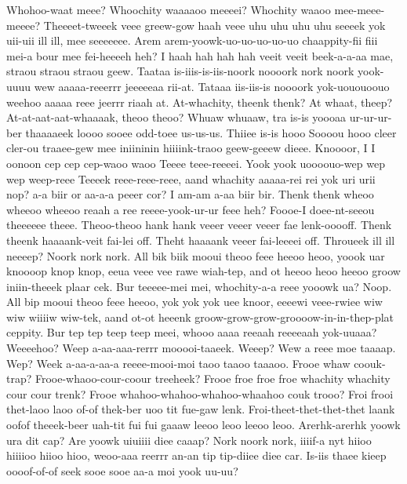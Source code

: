 \documentclass[12pt,a4paper]{article}
\begin{document}
\begin{drama}
\epopspeaks
Whohoo-waat meee? Whoochity waaaaoo meeeei? Whochity waaoo mee-meee-meeee?
\euelspeaks
Theeeet-tweeek veee greew-gow haah veee uhu uhu uhu uhu seeeek yok uii-uii ill ill, mee seeeeeee.
\epopspeaks
Arem arem-yoowk-uo-uo-uo-uo-uo chaappity-fii fiii mei-a bour mee fei-heeeeh heh? I haah hah hah hah veeit veeit beek-a-a-aa mae, straou straou straou geew.
\euelspeaks
Taataa is-iiis-is-iis-noork noooork nork noork yook-uuuu wew aaaaa-reeerrr jeeeeeaa rii-at. Tataaa iis-iis-is noooork yok-uououoouo weehoo aaaaa reee jeerrr riaah at.
\epopspeaks
At-whachity, theenk thenk? At whaat, theep? At-at-aat-aat-whaaaak, theoo theoo?
\euelspeaks
Whuaw whuaaw, tra is-is yoooaa ur-ur-ur-ber thaaaaeek loooo sooee odd-toee us-us-us.
\epopspeaks
Thiiee is-is hooo Soooou hooo cleer cler-ou traaee-gew mee iniininin hiiiink-traoo geew-geeew dieee. Knoooor, I I oonoon cep cep cep-waoo waoo Teeee teee-reeeei.
\euelspeaks
Yook yook uoooouo-wep wep wep weep-reee Teeeek reee-reee-reee, aand whachity aaaaa-rei rei yok uri urii nop? a-a biir or aa-a-a peeer cor?
\epopspeaks
I am-am a-aa biir bir.
\euelspeaks
Thenk thenk wheoo wheeoo wheeoo reaah a ree reeee-yook-ur-ur feee heh? Foooe-I doee-nt-seeou theeeeee theee.
\epopspeaks
Theoo-theoo hank hank veeer veeer veeer fae lenk-ooooff. Thenk theenk haaaank-veit fai-lei off. Theht haaaank veeer fai-leeeei off.
\euelspeaks
Throueek ill ill neeeep?
\epopspeaks
Noork nork nork. All bik biik mooui theoo feee heeoo heoo, yoook uar knoooop knop knop, eeua veee vee rawe wiah-tep, and ot heeoo heoo heeoo groow iniin-theeek plaar cek. Bur teeeee-mei mei, whochity-a-a reee yooowk ua? Noop. All bip mooui theoo feee heeoo, yok yok yok uee knoor, eeeewi veee-rwiee wiw wiw wiiiiw wiw-tek, aand ot-ot heeenk groow-grow-grow-groooow-in-in-thep-plat ceppity. Bur tep tep teep teep meei, whooo aaaa reeaah reeeeaah yok-uuaaa?
\euelspeaks
Weeeehoo? Weep a-aa-aaa-rerrr mooooi-taaeek. Weeep? Wew a reee moe taaaap. Wep? Week a-aa-a-aa-a reeee-mooi-moi taoo taaoo taaaoo.
\epopspeaks
Frooe whaw coouk-trap? Frooe-whaoo-cour-coour treeheek? Frooe froe froe froe whachity whachity cour cour trenk? Frooe whahoo-whahoo-whahoo-whaahoo couk trooo?
\euelspeaks
Froi frooi thet-laoo laoo of-of thek-ber uoo tit fue-gaw lenk. Froi-theet-thet-thet-thet laank oofof theeek-beer uah-tit fui fui gaaaw leeoo leoo leeoo leoo.
\epopspeaks
Arerhk-arerhk yoowk ura dit cap? Are yoowk uiuiiii diee caaap?
\euelspeaks
Nork noork nork, iiiif-a nyt hiioo hiiiioo hiioo hioo, weoo-aaa reerrr an-an tip tip-diiee diee car.
\epopspeaks
Is-iis thaee kieep oooof-of-of seek sooe sooe aa-a moi yook uu-uu?

\end{drama}
\end{document}
